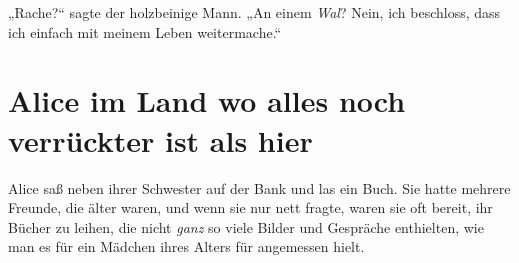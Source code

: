 „Rache?“ sagte der holzbeinige Mann.
„An einem \emph{Wal}? Nein, ich beschloss, dass ich einfach mit meinem Leben weitermache.“

\section{Alice im Land wo alles noch verrückter ist als hier\protect\footnotemark}
Alice saß neben ihrer Schwester auf der Bank und las ein Buch. Sie hatte mehrere Freunde, die älter waren, und wenn sie nur nett fragte, waren sie oft bereit, ihr Bücher zu leihen, die nicht \emph{ganz} so viele Bilder und Gespräche enthielten, wie man es für ein Mädchen ihres Alters für angemessen hielt.

